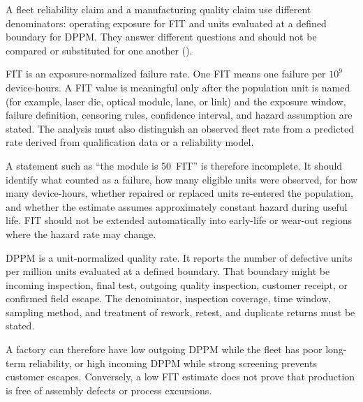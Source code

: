 A fleet reliability claim and a manufacturing quality claim use different
denominators: operating exposure for FIT and units evaluated at a defined
boundary for DPPM. They answer different questions and should not be compared
or substituted for one another ().

FIT is an
exposure-normalized failure rate. One FIT means one failure per $10^{9}$
device-hours. A FIT value is meaningful only after the population unit is
named (for example, laser die, optical module, lane, or link) and the exposure
window, failure definition, censoring rules, confidence interval, and hazard
assumption are stated. The analysis must also distinguish an observed
fleet rate from a predicted rate derived from qualification data or a
reliability model.

A statement such as ``the module is 50~FIT'' is therefore incomplete. It should
identify what counted as a failure, how many eligible units were observed, for
how many device-hours, whether repaired or replaced units re-entered the
population, and whether the estimate assumes approximately constant hazard
during useful life. FIT should not be extended automatically into early-life or
wear-out regions where the hazard rate may change.

DPPM is
a unit-normalized quality rate. It reports the number of defective units per
million units evaluated at a defined boundary. That boundary might be incoming
inspection, final test, outgoing quality inspection, customer receipt, or
confirmed field escape. The denominator, inspection coverage, time window,
sampling method, and treatment of rework, retest, and duplicate returns must be
stated.

A factory can therefore have low outgoing DPPM while the fleet has poor
long-term reliability, or high incoming DPPM while strong screening prevents
customer escapes. Conversely, a low FIT estimate does not prove that production
is free of assembly defects or process excursions.

